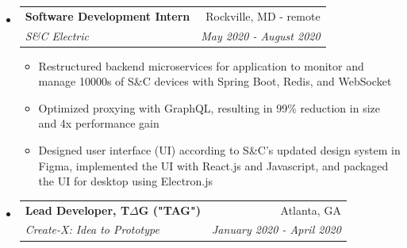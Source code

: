 \documentclass[letterpaper,10pt]{article}
\makeatletter
\newcommand{\resitem}[1]{\item #1 \vspace{-3.5pt}}  %
\newcommand{\ressubheading}[4]{
\begin{tabular*}{7.0in}{l@{\extracolsep{\fill}}r}  
		\textbf{#1} & #2 \\
		\textit{#3} & \textit{#4} \\
\end{tabular*}\vspace{-6pt}}  %
\makeatother
\begin{document}
\begin{itemize}
\begin{itemize}
    \end{itemize}
\item
    \ressubheading{Software Development Intern}{Rockville, MD - remote}{S\&C Electric}{May 2020 - August 2020}
    \begin{itemize}
        \resitem{Restructured backend microservices for application to monitor and manage 10000s of S\&C devices with Spring Boot, Redis, and WebSocket}
        \resitem{Optimized proxying with GraphQL, resulting in 99\% reduction in size and 4x performance gain}
        \resitem{Designed user interface (UI) according to S\&C's updated design system in Figma, implemented the UI with React.js and Javascript, and packaged the UI for desktop using Electron.js}
    \end{itemize}
\item
    \ressubheading{Lead Developer, T$\Delta$G ("TAG")}{Atlanta, GA}{Create-X: Idea to Prototype}{January 2020 - April 2020}

\end{itemize}
\end{document}
